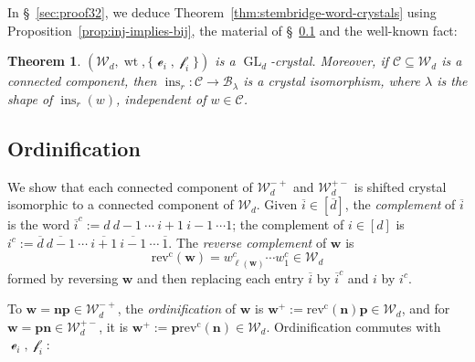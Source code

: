 \documentclass[12pt]{amsart}
\newcommand{\bs}{\boldsymbol}
\DeclareMathOperator{\worde}{{\mathcal e}}
\DeclareMathOperator{\wordf}{{\mathcal f}}
\newtheorem{theorem}{Theorem}[section]
\theoremstyle{definition}
\theoremstyle{remark}
\newcommand{\barindex}[1]{\overline{#1}}
\begin{document}
In \S~\ref{sec:proof32}, we deduce Theorem~\ref{thm:stembridge-word-crystals} using 
Proposition~\ref{prop:inj-implies-bij}, the material of \S~\ref{sec:ordinification} and the well-known fact:
\begin{theorem}\label{thm:basicwordsarecrystal}
$(\mathcal W_d,\operatorname{wt},\{\worde_i,\wordf_i\})$ is a
$\operatorname{GL}_d$-crystal. Moreover, if $\mathcal C\subseteq
\mathcal W_d$ is a connected component, then
$\operatorname{ins}_r:\mathcal C\longrightarrow\mathcal B_\lambda$
is a crystal isomorphism, where $\lambda$ is the shape of
$\operatorname{ins}_r(w)$, independent of $w\in\mathcal C$.
\end{theorem}

\subsection{Ordinification}\label{sec:ordinification}
 We show that each connected component of 
${\mathcal W}^{-+}_d$ and ${\mathcal W}_d^{+-}$ is shifted crystal isomorphic to a connected component of 
${\mathcal W}_d$. Given $ \barindex{i}\in[\barindex{d}]$, the \emph{complement} of $\barindex{i}$ is the word $\barindex{i}^c := d \ d-1\ \cdots \ i+1 \ i-1 \ \cdots 1$; 
the complement of $i\in[d]$ is $i^c := \barindex{d} \ \barindex{d-1} \ \cdots\ \barindex{i+1}\ 
\barindex{i-1} \ \cdots \ \barindex{1}$. The \emph{reverse complement} of ${\bs w}$ is 
\[
\operatorname{rev^c}({\bs w}) = w_{\ell({\bs w})}^c \cdots w_1^c \in {\mathcal W}_d
\]
formed by reversing ${\bs w}$ and then replacing each entry $\barindex{i}$ by $\barindex{i}^c$ and $i$ by $i^c$. 

To ${\bs w} = {\bs n}{\bs p}\in {\mathcal W}_d^{-+}$,
the \emph{ordinification} of ${\bs w}$ is ${\bs w}^+ := \operatorname{rev^c}({\bs n}){\bs p} \in {\mathcal W}_d$,
and for ${\bs w} = {\bs p}{\bs n}\in {\mathcal W}_d^{+-}$,
it is ${\bs w}^+ := {\bs p}\operatorname{rev^c}({\bs n}) \in {\mathcal W}_d$.
Ordinification commutes with $\worde_i, \wordf_i$:
\end{document}
